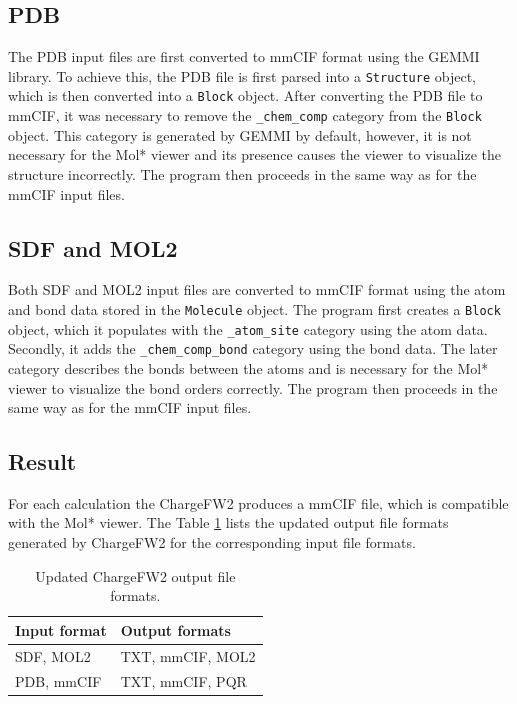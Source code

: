 \documentclass[
  digital,     %
  oneside,     %
  nosansbold,  %
  nocolorbold, %
  lof,         %
  lot,         %
]{fithesis4}
\begin{document}
\subsection{PDB}

The PDB input files are first converted to mmCIF format using the GEMMI library. To achieve this, the PDB file is first parsed into a \texttt{Structure} object, which is then converted into a \texttt{Block} object. After converting the PDB file to mmCIF, it was necessary to remove the \texttt{\_chem\_comp} category from the \texttt{Block} object. This category is generated by GEMMI by default, however, it is not necessary for the Mol* viewer and its presence causes the viewer to visualize the structure incorrectly. The program then proceeds in the same way as for the mmCIF input files.

\subsection{SDF and MOL2}

Both SDF and MOL2 input files are converted to mmCIF format using the atom and bond data stored in the \texttt{Molecule} object. The program first creates a \texttt{Block} object, which it populates with the \texttt{\_atom\_site} category using the atom data. Secondly, it adds the \texttt{\_chem\_comp\_bond} category using the bond data. The later category describes the bonds between the atoms and is necessary for the Mol* viewer to visualize the bond orders correctly. The program then proceeds in the same way as for the mmCIF input files.

\subsection*{Result}

For each calculation the ChargeFW2 produces a mmCIF file, which is compatible with the Mol* viewer. The Table \ref{table:new_chargefw2_output_formats} lists the updated output file formats generated by ChargeFW2 for the corresponding input file formats.

\begin{table}[htbp]
  \centering
  \begin{tabular}{|l|l|}
    \hline
    \textbf{Input format} & \textbf{Output formats} \\
    \hline
    SDF, MOL2 & TXT, mmCIF, MOL2 \\
    \hline
    PDB, mmCIF & TXT, mmCIF, PQR \\
    \hline
  \end{tabular}
  \caption{Updated ChargeFW2 output file formats.}
  \label{table:new_chargefw2_output_formats}
\end{table}
\end{document}

